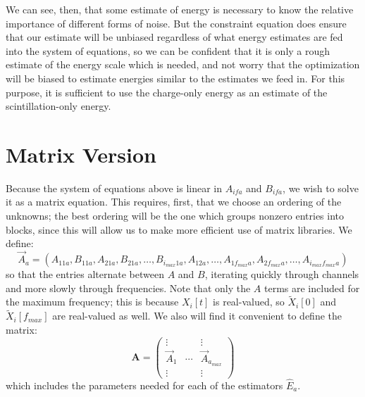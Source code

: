 We can see, then, that some estimate of energy is necessary to know the relative importance of different forms of noise.  But the constraint equation does ensure that our estimate will be unbiased regardless of what energy estimates are fed into the system of equations, so we can be confident that it is only a rough estimate of the energy scale which is needed, and not worry that the optimization will be biased to estimate energies similar to the estimates we feed in.  For this purpose, it is sufficient to use the charge-only energy as an estimate of the scintillation-only energy.

\section{Matrix Version}

Because the system of equations above is linear in $A_{ifa}$ and $B_{ifa}$, we wish to solve it as a matrix equation.  This requires, first, that we choose an ordering of the unknowns; the best ordering will be the one which groups nonzero entries into blocks, since this will allow us to make more efficient use of matrix libraries.  We define:
\begin{equation}
\vec{A}_a = (A_{1 1 a}, B_{1 1 a}, A_{2 1 a}, B_{2 1 a}, \dots, B_{i_{max} 1 a}, A_{1 2 a}, \dots, A_{1 f_{max} a}, A_{2 f_{max} a}, \dots, A_{i_{max} f_{max} a})
\end{equation}
so that the entries alternate between $A$ and $B$, iterating quickly through channels and more slowly through frequencies.  Note that only the $A$ terms are included for the maximum frequency; this is because $X_i[t]$ is real-valued, so $\widetilde{X}_i[0]$ and $\widetilde{X}_i[f_{max}]$ are real-valued as well.  We also will find it convenient to define the matrix:
\begin{equation}
\mathbf{A} = \begin{pmatrix}
\vdots & & \vdots \\
\vec{A}_1 & \cdots & \vec{A}_{a_{max}} \\
\vdots & & \vdots
\end{pmatrix}
\end{equation}
which includes the parameters needed for each of the estimators $\widehat{E}_a$.

